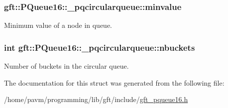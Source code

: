 \hypertarget{structgft_1_1PQueue16_1_1__pqcircularqueue_a7cceb7dbbae52c61f53e44735ebb8156}{
\subsubsection[{minvalue}]{ gft\-::\-P\-Queue16\-::\-\_\-pqcircularqueue\-::minvalue}}\label{structgft_1_1PQueue16_1_1__pqcircularqueue_a7cceb7dbbae52c61f53e44735ebb8156}


Minimum value of a node in queue. 

\hypertarget{structgft_1_1PQueue16_1_1__pqcircularqueue_a04b672c1f097742297f79ca45672f248}{
\subsubsection[{nbuckets}]{\setlength{\rightskip}{0pt plus 5cm}int gft\-::\-P\-Queue16\-::\-\_\-pqcircularqueue\-::nbuckets}}\label{structgft_1_1PQueue16_1_1__pqcircularqueue_a04b672c1f097742297f79ca45672f248}


Number of buckets in the circular queue. 



The documentation for this struct was generated from the following file\-:\begin{DoxyCompactItemize}
\item 
/home/pavm/programming/lib/gft/include/\hyperlink{gft__pqueue16_8h}{gft\-\_\-pqueue16.\-h}\end{DoxyCompactItemize}
